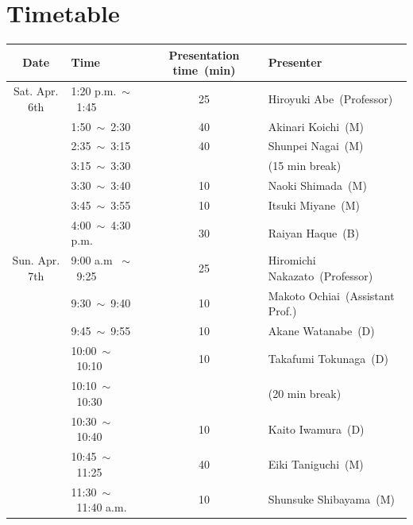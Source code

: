 \documentclass[unicode,a4paper,11pt]{ltjsarticle}
\begin{document}
\section{Timetable}

\begin{center}
      \begin{tabular}{clcl}\hline
            Date          & Time                      & Presentation time\ (min) & Presenter                        \\ \hline
            Sat. Apr. 6th & 1:20 p.m.\ $\sim$\ 1:45   & 25                       & Hiroyuki Abe\ (Professor)        \\
                          & 1:50\ $\sim$\ 2:30        & 40                       & Akinari Koichi\ (M)              \\
                          & 2:35\ $\sim$\ 3:15        & 40                       & Shunpei Nagai\ (M)               \\
                          & 3:15\ $\sim$\ 3:30        &                          & (15 min break)                   \\
                          & 3:30\ $\sim$\ 3:40        & 10                       & Naoki Shimada\ (M)               \\
                          & 3:45\ $\sim$\ 3:55        & 10                       & Itsuki Miyane\ (M)               \\
                          & 4:00\ $\sim$\ 4:30 p.m.   & 30                       & Raiyan Haque\ (B)                \\ \hline
            Sun. Apr. 7th & 9:00 a.m \ $\sim$\ 9:25   & 25                       & Hiromichi Nakazato\ (Professor)  \\
                          & 9:30\ $\sim$\ 9:40        & 10                       & Makoto Ochiai\ (Assistant Prof.) \\
                          & 9:45\ $\sim$\ 9:55        & 10                       & Akane Watanabe\ (D)              \\
                          & 10:00\ $\sim$\ 10:10      & 10                       & Takafumi Tokunaga\ (D)           \\
                          & 10:10\ $\sim$\ 10:30      &                          & (20 min break)                   \\
                          & 10:30\ $\sim$\ 10:40      & 10                       & Kaito Iwamura\ (D)               \\
                          & 10:45\ $\sim$\ 11:25      & 40                       & Eiki Taniguchi\ (M)              \\
                          & 11:30\ $\sim$\ 11:40 a.m. & 10                       & Shunsuke Shibayama\ (M)          \\ \hline
      \end{tabular}
\end{center}
\end{document}
